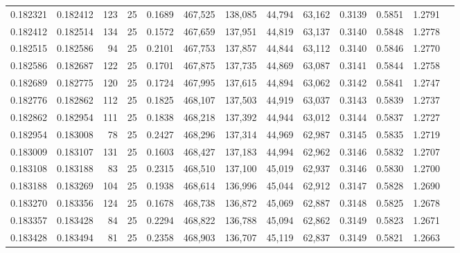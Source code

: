 \begin{tabular}{rrrrrrrrrrrrr}
0.182321 & 0.182412 &   123 &  25 &                                     0.1689 & 467,525 & 138,085 &  44,794 &  63,162 & 0.3139 & 0.5851 & 1.2791 \\
0.182412 & 0.182514 &   134 &  25 &                                     0.1572 & 467,659 & 137,951 &  44,819 &  63,137 & 0.3140 & 0.5848 & 1.2778 \\
0.182515 & 0.182586 &    94 &  25 &                                     0.2101 & 467,753 & 137,857 &  44,844 &  63,112 & 0.3140 & 0.5846 & 1.2770 \\
0.182586 & 0.182687 &   122 &  25 &                                     0.1701 & 467,875 & 137,735 &  44,869 &  63,087 & 0.3141 & 0.5844 & 1.2758 \\
0.182689 & 0.182775 &   120 &  25 &                                     0.1724 & 467,995 & 137,615 &  44,894 &  63,062 & 0.3142 & 0.5841 & 1.2747 \\
0.182776 & 0.182862 &   112 &  25 &                                     0.1825 & 468,107 & 137,503 &  44,919 &  63,037 & 0.3143 & 0.5839 & 1.2737 \\
0.182862 & 0.182954 &   111 &  25 &                                     0.1838 & 468,218 & 137,392 &  44,944 &  63,012 & 0.3144 & 0.5837 & 1.2727 \\
0.182954 & 0.183008 &    78 &  25 &                                     0.2427 & 468,296 & 137,314 &  44,969 &  62,987 & 0.3145 & 0.5835 & 1.2719 \\
0.183009 & 0.183107 &   131 &  25 &                                     0.1603 & 468,427 & 137,183 &  44,994 &  62,962 & 0.3146 & 0.5832 & 1.2707 \\
0.183108 & 0.183188 &    83 &  25 &                                     0.2315 & 468,510 & 137,100 &  45,019 &  62,937 & 0.3146 & 0.5830 & 1.2700 \\
0.183188 & 0.183269 &   104 &  25 &                                     0.1938 & 468,614 & 136,996 &  45,044 &  62,912 & 0.3147 & 0.5828 & 1.2690 \\
0.183270 & 0.183356 &   124 &  25 &                                     0.1678 & 468,738 & 136,872 &  45,069 &  62,887 & 0.3148 & 0.5825 & 1.2678 \\
0.183357 & 0.183428 &    84 &  25 &                                     0.2294 & 468,822 & 136,788 &  45,094 &  62,862 & 0.3149 & 0.5823 & 1.2671 \\
0.183428 & 0.183494 &    81 &  25 &                                     0.2358 & 468,903 & 136,707 &  45,119 &  62,837 & 0.3149 & 0.5821 & 1.2663 \\

\end{tabular}
